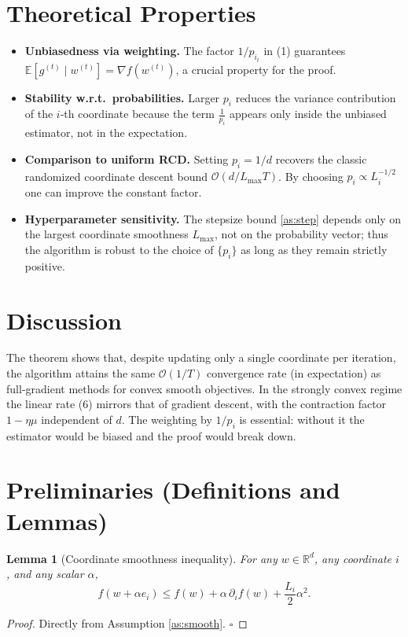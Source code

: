 \documentclass{article}
\newtheorem{lemma}{Lemma}
\newcommand{\E}{\mathbb{E}}
\newcommand{\R}{\mathbb{R}}
\begin{document}
\section*{Theoretical Properties}
\begin{itemize}[leftmargin=*]
\item \textbf{Unbiasedness via weighting.} The factor $1/p_{i_t}$ in (1) guarantees
$\E[g^{(t)}\mid w^{(t)}]=\nabla f(w^{(t)})$, a crucial property for the proof.
\item \textbf{Stability w.r.t.\ probabilities.} Larger $p_i$ reduces the variance
contribution of the $i$‑th coordinate because the term $\tfrac{1}{p_i}$ appears only
inside the unbiased estimator, not in the expectation.
\item \textbf{Comparison to uniform RCD.} Setting $p_i=1/d$ recovers the classic
randomized coordinate descent bound $\mathcal{O}(d/L_{\max}T)$. By choosing
$p_i\propto L_i^{-1/2}$ one can improve the constant factor.
\item \textbf{Hyperparameter sensitivity.} The stepsize bound \eqref{as:step}
depends only on the largest coordinate smoothness $L_{\max}$, not on the
probability vector; thus the algorithm is robust to the choice of $\{p_i\}$ as
long as they remain strictly positive.
\end{itemize}

\section*{Discussion}
The theorem shows that, despite updating only a single coordinate per iteration,
the algorithm attains the same $\mathcal{O}(1/T)$ convergence rate (in expectation) as full‑gradient methods for convex smooth objectives. In the strongly convex regime the linear rate (6) mirrors that of gradient descent, with the contraction factor $1-\eta\mu$ independent of $d$. The weighting by $1/p_i$ is essential: without it the estimator would be biased and the proof would break down.

\newpage
\section*{Preliminaries (Definitions and Lemmas)}
\begin{lemma}[Coordinate smoothness inequality]\label{lem:smooth}
For any $w\in\R^{d}$, any coordinate $i$, and any scalar $\alpha$,
\[
f(w+\alpha e_i)\le f(w)+\alpha\,\partial_i f(w)+\frac{L_i}{2}\alpha^{2}.
\]
\end{lemma}
\begin{proof}
Directly from Assumption \ref{as:smooth}. \hfill $\square$
\end{proof}
\end{document}
